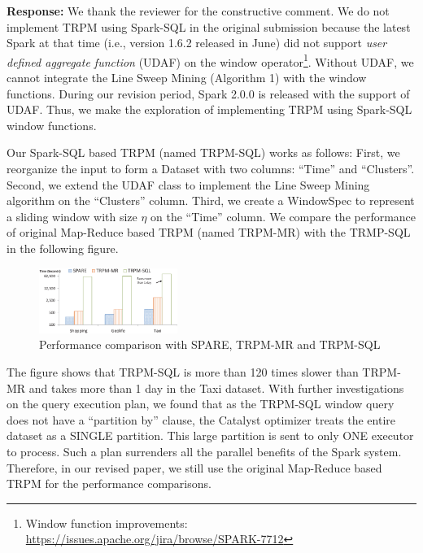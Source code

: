 \documentclass{vldb}
\begin{document}
\textbf{Response:} We thank the reviewer for the constructive comment.
We do not implement TRPM using Spark-SQL in the original submission because the latest Spark at that time (i.e., version 1.6.2 released in June)
did not support \textit{user defined aggregate function} (UDAF) on the window operator\footnote{Window function improvements: \url{https://issues.apache.org/jira/browse/SPARK-7712}}. 
Without UDAF, we cannot integrate the Line Sweep Mining (Algorithm 1) with the window functions. During our revision period, Spark 2.0.0 is released with the support of UDAF. Thus, we make the exploration of implementing TRPM using Spark-SQL window functions.

Our Spark-SQL based TRPM (named TRPM-SQL) works as follows:
First, we reorganize the input to form a Dataset with two columns: ``Time'' and ``Clusters''. 
Second, we extend the UDAF class to implement the Line Sweep Mining algorithm on the ``Clusters'' column. Third, we 
create a WindowSpec to represent a sliding window with size $\eta$ on the ``Time'' column. We compare the performance
of original Map-Reduce based TRPM (named TRPM-MR) with the TRMP-SQL in the following figure.

\begin{figure}[h]
\centering
\includegraphics[width=0.4\textwidth]{spark-sql-comp.eps}
\caption{Performance comparison with SPARE, TRPM-MR and TRPM-SQL}
\end{figure}

The figure shows that TRPM-SQL is more than 120 times slower than TRPM-MR and 
takes more than 1 day in the Taxi dataset. With further investigations on the query execution
plan, 
we found that as the TRPM-SQL window query does not have a ``partition by'' clause, the Catalyst
optimizer treats the entire dataset as a SINGLE partition. This 
large partition is sent to only ONE executor to process. Such a plan
surrenders all the parallel benefits of the Spark system. Therefore, in our revised paper, we
still use the original Map-Reduce based TRPM for the performance comparisons.
% 
%
%
\end{document}
